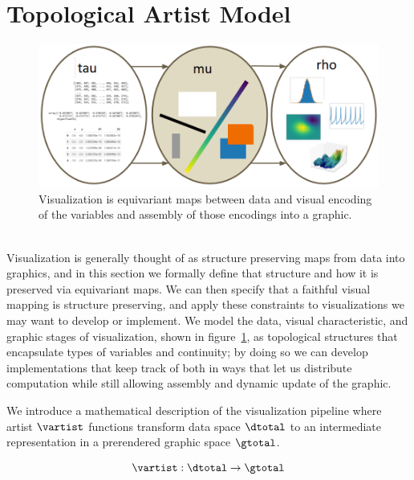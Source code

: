 \documentclass[../main.tex]{subfiles}
\begin{document}
\section{Topological Artist Model}
\label{sec:tam}
\begin{figure}[H]
    \includegraphics[width=\textwidth]{figures/math/dar.png}
    \caption{Visualization is equivariant maps between data and visual encoding of the variables and assembly of those encodings into a graphic.
    }
    \label{fig:artist_stages}
\end{figure}

\\
Visualization is generally thought of as structure preserving maps from data into graphics, and in this section we formally define that structure and how it is preserved via equivariant maps. We can then specify that a faithful visual mapping is structure preserving, and apply these constraints to visualizations we may want to develop or implement. We model the data, visual characteristic, and graphic stages of visualization, shown in figure~\ref{fig:artist_stages}, as topological structures that encapsulate types of variables and continuity; by doing so we can develop implementations that keep track of both in ways that let us distribute computation while still allowing assembly and dynamic update of the graphic. 

We introduce a mathematical description of the visualization pipeline where artist $\mathscr{\vartist}$ functions transform data space $\mathscr{\dtotal}$ to an intermediate representation in a prerendered graphic space $\mathscr{\gtotal}$.

\begin{equation}
    \label{eq:artist}
    \mathscr{\vartist}: \mathscr{\dtotal} \rightarrow \mathscr{\gtotal}
\end{equation}
\end{document}
